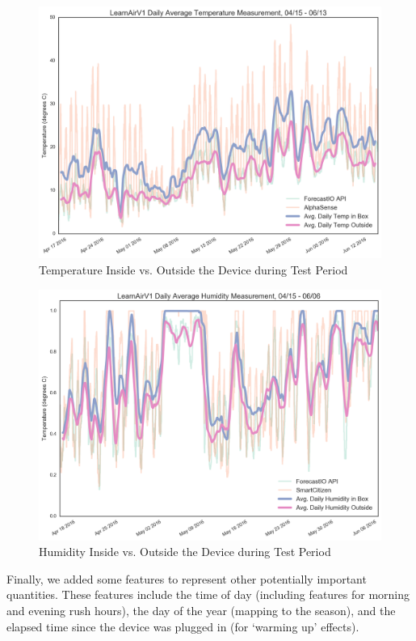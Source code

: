 \begin{figure}[htb]
\centering
 	\includegraphics[width=\textwidth-2cm]{figs/temp_daily}               
 	 \caption{Temperature Inside vs. Outside the Device during Test Period}
  	\label{fig:temp_daily}
\end{figure}

\begin{figure}[htb]
\centering
 	\includegraphics[width=\textwidth - 2cm]{figs/humidity_daily}               
 	 \caption{Humidity Inside vs. Outside the Device during Test Period}
  	\label{fig:humidity_daily}
\end{figure}

Finally, we added some features to represent other potentially important quantities.  These features include the time of day (including features for morning and evening rush hours), the day of the year (mapping to the season), and the elapsed time since the device was plugged in (for `warming up' effects).

